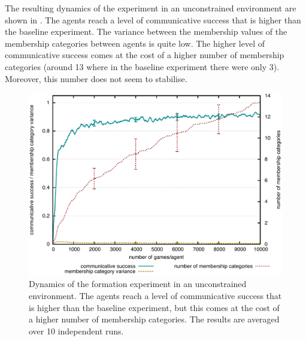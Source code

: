 The resulting dynamics of the experiment in an unconstrained
environment are shown in . The
agents reach a level of communicative success that is higher than the
baseline experiment. The variance between the membership values of the
membership categories between agents is quite low. The higher level of
communicative success comes at the cost of a higher number of
membership categories (around 13 where in the baseline experiment
there were only 3). Moreover, this number does not seem to stabilise.

\begin{figure}[htpb]
  \begin{center}
    \includegraphics[width=.8\textwidth]{./graded-membership/figures/strict-formation.pdf}
    \caption[Dynamics of the formation experiment in an unconstrained
    environment]{Dynamics of the formation experiment in an
      unconstrained environment. The agents reach a level of
      communicative success that is higher than the baseline
      experiment, but this comes at the cost of a higher number of
      membership categories. The results are averaged over 10
      independent runs.}
    \label{f:gm-formation-dynamics}
  \end{center}
\end{figure}

